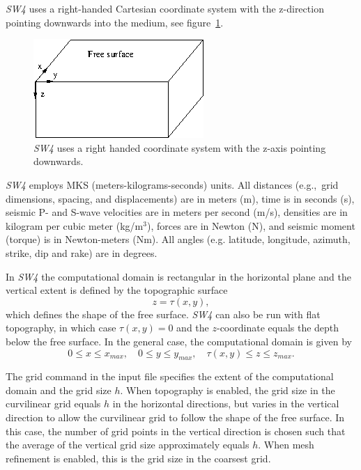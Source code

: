 \documentclass[11pt]{report}
\begin{document}
\emph{SW4} uses a right-handed Cartesian coordinate system with the z-direction pointing
downwards into the medium, see figure~\ref{fig:coordsys}. 
\begin{figure}[th]
\begin{centering}
 \includegraphics[width=0.6\linewidth]{figures/coords.png}
  \caption{\emph{SW4} uses a right handed coordinate system with the z-axis pointing
  downwards.}
  \label{fig:coordsys}
\end{centering}
\end{figure}
\emph{SW4} employs MKS (meters-kilograms-seconds) units. All distances (e.g.,~grid dimensions,
spacing, and displacements) are in meters (m), time is in seconds (s), seismic P- and S-wave
velocities are in meters per second (m/s), densities are in kilogram per cubic meter (kg/m$^3$),
forces are in Newton (N), and seismic moment (torque) is in Newton-meters (Nm). All angles
(e.g. latitude, longitude, azimuth, strike, dip and rake) are in degrees. 

In \emph{SW4} the computational domain is rectangular in the horizontal plane and the vertical extent
is defined by the topographic surface
\[
z=\tau(x,y),
\]
which defines the shape of the free surface. \emph{SW4} can also be run with flat topography, in
which case $\tau(x,y)=0$ and the $z$-coordinate equals the depth below the free surface. In the general
case, the computational domain is given by
\begin{equation}\label{eq:domain}
0\leq x\leq x_{max},\quad 0\leq y\leq y_{max},\quad \tau(x,y) \leq z \leq z_{max}.
\end{equation}

The grid command in the input file specifies the extent of the computational domain and the grid
size $h$. When topography is enabled, the grid size in the curvilinear grid equals $h$ in the
horizontal directions, but varies in the vertical direction to allow the curvilinear grid to follow
the shape of the free surface. In this case, the number of grid points in the vertical direction is
chosen such that the average of the vertical grid size approximately equals $h$.
When mesh refinement is enabled, this is the grid size in the coarsest grid. 
\end{document}

